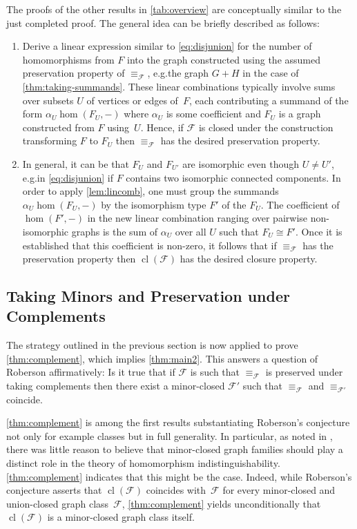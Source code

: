 \documentclass[3p,final]{elsarticle}
\DeclareMathOperator{\cl}{cl}
\begin{document}
	The proofs of the other results in \cref{tab:overview} are conceptually similar to the just completed proof. 
	The general idea can be briefly described as follows:
	\begin{enumerate}
	\item Derive a linear expression similar to \cref{eq:disjunion} for the number of homomorphisms from $F$ into the graph constructed using the assumed preservation property of $\equiv_{\mathcal{F}}$, e.g.\@ the graph $G+H$ in the case of \cref{thm:taking-summands}. These linear combinations typically involve sums over subsets $U$ of vertices or edges of~$F$, each contributing a summand of the form $\alpha_U\hom(F_U, -)$ where $\alpha_U$ is some coefficient and $F_U$ is a graph constructed from $F$ using~$U$. Hence, if $\mathcal{F}$ is closed under the construction transforming $F$ to $F_U$ then $\equiv_{\mathcal{F}}$ has the desired preservation property.
	\item In general, it can be that $F_U$ and $F_{U'}$ are isomorphic even though $U \neq U'$, e.g.\@ in \cref{eq:disjunion} if $F$ contains two isomorphic connected components. 
	In order to apply \cref{lem:lincomb}, one must group the summands $\alpha_U\hom(F_U, -)$ by the isomorphism type $F'$ of the $F_U$. 
	The coefficient of $\hom(F', -)$ in the new linear combination ranging over pairwise non-isomorphic graphs is the sum of $\alpha_U$ over all $U$ such that $F_U \cong F'$.
	Once it is established that this coefficient is non-zero, it follows that if $\equiv_{\mathcal{F}}$ has the preservation property then $\cl(\mathcal{F})$ has the desired closure property.
	\end{enumerate}
	


	
	\subsection{Taking Minors and Preservation under Complements}
	\label{sec:complements}
	
	The strategy outlined in the previous section is now applied to prove \cref{thm:complement}, which implies \cref{thm:main2}.
	This answers a question of Roberson  \cite[Question~8]{roberson_oddomorphisms_2022} affirmatively: Is it true that if $\mathcal{F}$ is such that $\equiv_{\mathcal{F}}$ is preserved under taking complements then there exist a minor-closed $\mathcal{F'}$ such that $\equiv_{\mathcal{F}}$ and $\equiv_{\mathcal{F}'}$ coincide.
	
	\cref{thm:complement} is among the first results substantiating Roberson's conjecture not only for example classes but in full generality.
	In particular, as noted in \cite[p.\@~2]{roberson_oddomorphisms_2022}, there was little reason to believe that minor-closed graph families should play a distinct role in the theory of homomorphism indistinguishability. \cref{thm:complement} indicates that this might be the case.
	Indeed, while Roberson's conjecture asserts that $\cl(\mathcal{F})$ coincides with~$ \mathcal{F}$ for every minor-closed and union-closed graph class~$\mathcal{F}$, \cref{thm:complement} yields unconditionally that $\cl(\mathcal{F})$ is a minor-closed graph class itself.
	
\end{document}
